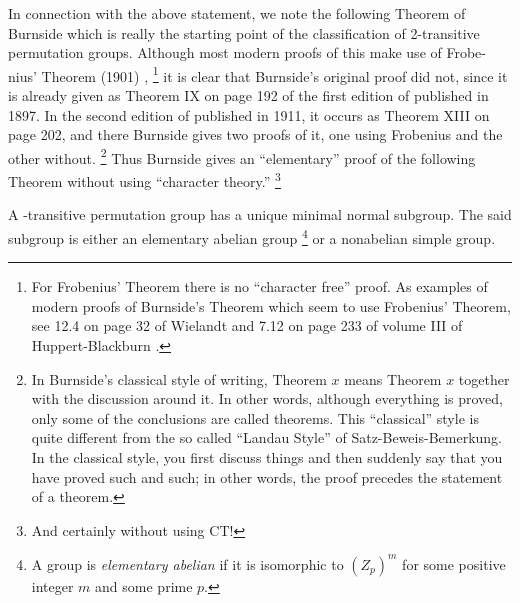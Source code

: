 In connection with the above statement, we note the 
following Theorem of
Burnside which is really the starting point of the 
classification of
2-transitive permutation groups. Although most modern proofs
of this make use of Frobe- nius' Theorem (1901) \cite{Fr},
\footnote{For Frobenius' Theorem there is no ``character 
free'' proof.
As examples of modern proofs of Burnside's Theorem which 
seem to use
Frobenius' Theorem, see 12.4 on page 32 of Wielandt 
\cite{Wi} 
and 7.12 on page 233 of volume III of Huppert-Blackburn 
\cite{HB}.}
it is clear that Burnside's original proof did not, since 
it is already
given as Theorem IX on page 192 of the first edition of 
\cite{Bu}
published in 1897. In the second edition of \cite{Bu} 
published in
1911, it occurs as Theorem XIII on page 202, and there 
Burnside gives two 
proofs of it, one using Frobenius and the other without.
\footnote{In Burnside's classical style of writing, 
Theorem $x$ means
Theorem $x$ together with the discussion around it. In 
other words,
although everything is proved, only some of the 
conclusions are
called theorems. This ``classical'' style is quite 
different from the so 
called ``Landau Style'' of Satz-Beweis-Bemerkung. 
In the classical style, you first discuss things and then 
suddenly
say that you have proved such and such; in other words, 
the proof 
precedes the statement of a theorem.}
Thus Burnside gives an ``elementary'' proof of the 
following Theorem
without using ``character theory.''
\footnote{And certainly without using CT!}

A -transitive permutation group has a unique minimal 
normal subgroup.
The said subgroup is either an elementary abelian group
\footnote{A group is {\it elementary abelian} if it is 
isomorphic to 
$(Z_p)^m$ for some positive integer $m$ and some prime $p$.}
or a nonabelian simple group.
\endproclaim


